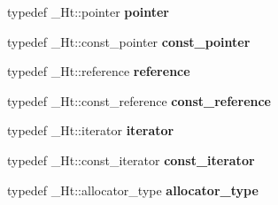 \begin{DoxyCompactItemize}
\item 
\mbox{\label{classhash__multiset_a77cc638c20bf70749fdf6c3cb12ed180}} 
typedef \+\_\+\+Ht\+::pointer {\bfseries pointer}
\item 
\mbox{\label{classhash__multiset_a0a807b4e81b42c9e2cb3ed6b562262ef}} 
typedef \+\_\+\+Ht\+::const\+\_\+pointer {\bfseries const\+\_\+pointer}
\item 
\mbox{\label{classhash__multiset_a726244b89aedf1ce19728402843f1611}} 
typedef \+\_\+\+Ht\+::reference {\bfseries reference}
\item 
\mbox{\label{classhash__multiset_a62936b727044659d4f7777c31b4925df}} 
typedef \+\_\+\+Ht\+::const\+\_\+reference {\bfseries const\+\_\+reference}
\item 
\mbox{\label{classhash__multiset_ab1164661235df9b02447234abc9cad86}} 
typedef \+\_\+\+Ht\+::iterator {\bfseries iterator}
\item 
\mbox{\label{classhash__multiset_a75eb8a8962ee0503d23cce9ac0eacd72}} 
typedef \+\_\+\+Ht\+::const\+\_\+iterator {\bfseries const\+\_\+iterator}
\item 
\mbox{\label{classhash__multiset_ad77b0e776cde97f94ecc3e734a21fa56}} 
typedef \+\_\+\+Ht\+::allocator\+\_\+type {\bfseries allocator\+\_\+type}
\end{DoxyCompactItemize}
